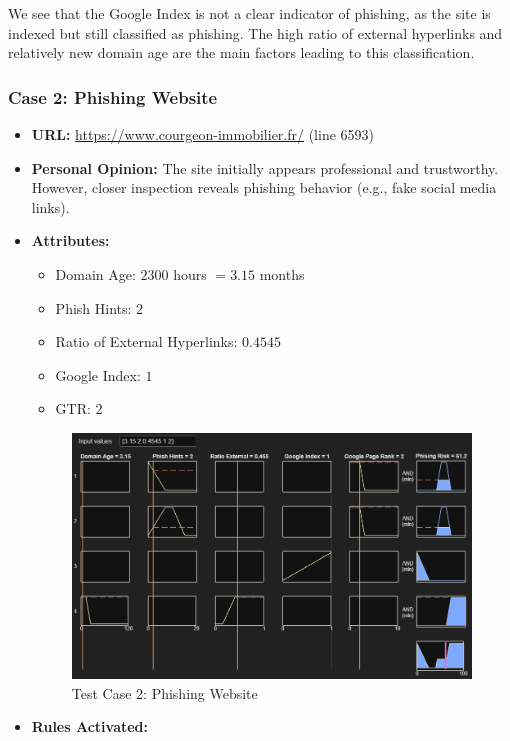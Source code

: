 \documentclass[11pt]{article}
\begin{document}
We see that the Google Index is not a clear indicator of phishing, as the site is indexed but still classified as phishing. The high ratio of external hyperlinks and relatively new domain age are the main factors leading to this classification.

\subsubsection{Case 2: Phishing Website}

\begin{itemize}
    \item \textbf{URL:} \url{https://www.courgeon-immobilier.fr/} (line 6593)
    \item \textbf{Personal Opinion:} The site initially appears professional and trustworthy. However, closer inspection reveals phishing behavior (e.g., fake social media links).
    \item \textbf{Attributes:}
    \begin{itemize}
        \item Domain Age: $2300$ hours $= 3.15$ months
        \item Phish Hints: $2$
        \item Ratio of External Hyperlinks: $0.4545$
        \item Google Index: $1$
        \item GTR: $2$
    \end{itemize}
    \begin{figure}[h!]
        \centering
        \includegraphics[width=\textwidth]{test-2.png}
        \caption{Test Case 2: Phishing Website}
    \end{figure}
    \item \textbf{Rules Activated:} 

\end{itemize}
\end{document}
